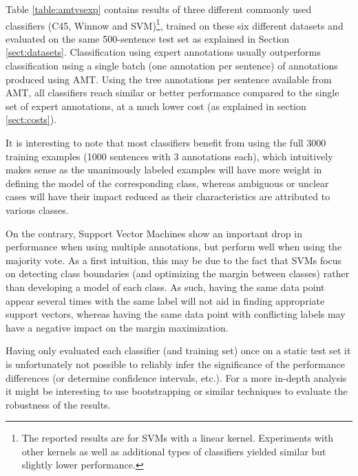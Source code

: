 \documentclass[11pt]{elsarticle}
\begin{document}
Table \ref{table:amtvsexp} contains results of three different commonly used classifiers (C45, Winnow and SVM)\footnote{The reported results are for SVMs with a linear kernel. Experiments with other kernels as well as additional types of classifiers yielded similar but slightly lower performance.}, trained on these six different datasets and evaluated on the same 500-sentence test set as explained in Section \ref{sect:datasets}. Classification using expert annotations usually outperforms classification using a single batch (one annotation per sentence) of annotations produced using AMT. Using the tree annotations per sentence available from AMT, all classifiers reach similar or better performance compared to the single set of expert annotations, at a much lower cost (as explained in section \ref{sect:costs}).

It is interesting to note that most classifiers benefit from using the full 3000 training examples (1000 sentences with 3 annotations each), which intuitively makes sense as the unanimously labeled examples will have more weight in defining the model of the corresponding class, whereas ambiguous or unclear cases will have their impact reduced as their characteristics are attributed to various classes.

On the contrary, Support Vector Machines show an important drop in performance when using multiple annotations, but perform well when using the majority vote. As a first intuition, this may be due to the fact that SVMs focus on detecting class boundaries (and optimizing the margin between classes) rather than developing a model of each class. As such, having the same data point appear several times with the same label will not aid in finding appropriate support vectors, whereas having the same data point with conflicting labels may have a negative impact on the margin maximization.

Having only evaluated each classifier (and training set) once on a static test set it is unfortunately not possible to reliably infer the significance of the performance differences (or determine confidence intervals, etc.). For a more in-depth analysis it might be interesting to use bootstrapping or similar techniques to evaluate the robustness of the results.
\end{document}

